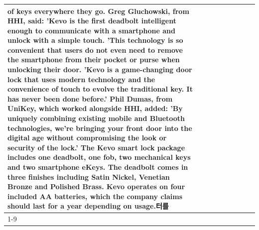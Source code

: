 \begin{table}[H]
\begin{tabular}{lllrlllll}
of keys everywhere they go. Greg Gluchowski, from HHI, said: 'Kevo is the first deadbolt intelligent enough to communicate with a smartphone and unlock with a simple touch. 'This technology is so convenient that users do not even need to remove the smartphone from their pocket or purse when unlocking their door. 'Kevo is a game-changing door lock that uses modern technology and the convenience of touch to evolve the traditional key. It has never been done before.' Phil Dumas, from UniKey, which worked alongside HHI, added: 'By uniquely combining existing mobile and Bluetooth technologies, we’re bringing your front door into the digital age without compromising the look or security of the lock.' The Kevo smart lock package includes one deadbolt, one fob, two mechanical keys and two smartphone eKeys. The deadbolt comes in three finishes including Satin Nickel, Venetian Bronze and Polished Brass. Kevo operates on four included AA batteries, which the company claims should last for a year depending on usage.터를 \\
\cline{1-9}

\end{tabular}
\end{table}
